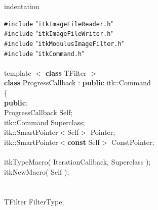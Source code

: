 %
%
\expandafter\ifx\csname indentation\endcsname\relax%
\newlength{\indentation}\fi
\setlength{\indentation}{0.5em}
\begin{flushleft}
{\tt \#include} "{\tt{}itkImageFileReader.h}"\mbox{}\\
{\tt \#include} "{\tt{}itkImageFileWriter.h}"\mbox{}\\
{\tt \#include} "{\tt{}itkModulusImageFilter.h}"\mbox{}\\
{\tt \#include} "{\tt{}itkCommand.h}"\mbox{}\\
\mbox{}\\
template $<$ {\bf class} TFilter $>$\mbox{}\\
{\bf class} ProgressCallback : {\bf public} itk::Command\mbox{}\\
\{\mbox{}\\
{\bf public}:\mbox{}\\
\hspace*{2\indentation}{\bf typedef} ProgressCallback   Self;\mbox{}\\
\hspace*{2\indentation}{\bf typedef} itk::Command  Superclass;\mbox{}\\
\hspace*{2\indentation}{\bf typedef} itk::SmartPointer$<$Self$>$  Pointer;\mbox{}\\
\hspace*{2\indentation}{\bf typedef} itk::SmartPointer$<${\bf const} Self$>$  ConstPointer;\mbox{}\\
\mbox{}\\
\hspace*{2\indentation}itkTypeMacro( IterationCallback, Superclass );\mbox{}\\
\hspace*{2\indentation}itkNewMacro( Self );\mbox{}\\
\hspace*{2\indentation}\mbox{}\\
\mbox{}\\
\hspace*{2\indentation}{\bf typedef}    TFilter     FilterType;\mbox{}\\
\mbox{}\\
\mbox{}\\

\end{flushleft}
